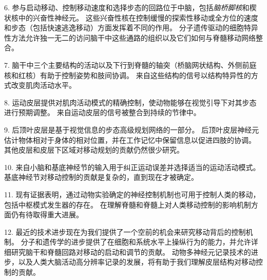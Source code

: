 6. 参与启动移动、控制移动速度和选择步态的回路位于中脑，包括\textit{脑桥脚核}和楔状核中的兴奋性神经元。
这些兴奋性核在控制缓慢的探索性移动或全方位的速度和步态（包括快速逃逸移动）方面发挥着不同的作用。
分子遗传驱动的细胞特异性方法允许独一无二的访问脑干中这些通路的组织以及它们如何与脊髓移动网络整合。


7. 脑干中三个主要结构的活动以及下行到脊髓的轴突（桥脑网状结构、外侧前庭核和红核）有助于控制姿势和肢间协调。
来自这些结构的信号以结构特异性的方式改变肌肉活动水平。


8. 运动皮层提供对肌肉活动模式的精确控制，使动物能够在视觉引导下对其步态进行预期调整。
来自运动皮层的信号被整合到持续的节律中。


9. 后顶叶皮层是基于视觉信息的步态高级规划网络的一部分。
后顶叶皮层神经元估计物体相对于身体的相对位置，并在工作记忆中保留信息以促进四肢的协调。
其他皮层和皮层下区域对移动规划的贡献仍然很少研究。


10. 来自小脑和基底神经节的输入用于纠正运动误差并选择适当的运动活动模式。
基底神经节对移动控制的贡献是复杂的，直到现在才被确定。


11. 现有证据表明，通过动物实验确定的神经控制机制也可用于控制人类的移动，包括中枢模式发生器的存在。
在理解脊髓和脊髓上对人类移动控制的影响机制方面仍有待取得重大进展。


12. 最近的技术进步现在为我们提供了一个空前的机会来研究移动背后的控制机制。
分子和遗传学的进步提供了在细胞和系统水平上操纵行为的能力，并允许详细研究脑干和脊髓回路对移动的启动和调节的贡献。
动物多神经元记录技术的进步，以及人类大脑活动高分辨率记录的发展，将有助于我们理解皮层结构对移动控制的贡献。

